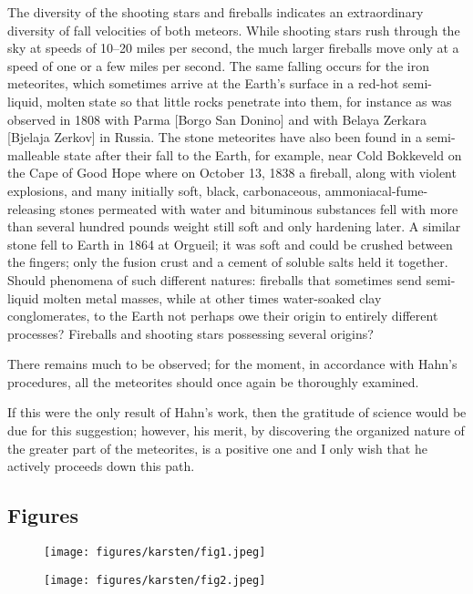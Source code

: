 \documentclass[a4paper, 12pt, oneside]{article}
\begin{document}
The diversity of the shooting stars and fireballs indicates an extraordinary diversity of fall velocities of both meteors. While shooting stars rush through the sky at speeds of 10--20 miles per second, the much larger fireballs move only at a speed of one or a few miles per second. The same falling occurs for the iron meteorites, which sometimes arrive at the Earth's surface in a red-hot semi-liquid, molten state so that little rocks penetrate into them, for instance as was observed in 1808 with Parma [Borgo San Donino] and with Belaya Zerkara [Bjelaja Zerkov] in Russia. The stone meteorites have also been found in a semi-malleable state after their fall to the Earth, for example, near Cold Bokkeveld on the Cape of Good Hope where on October 13, 1838 a fireball, along with violent explosions, and many initially soft, black, carbonaceous, ammoniacal-fume-releasing stones permeated with water and bituminous substances fell with more than several hundred pounds weight still soft and only hardening later. A similar stone fell to Earth in 1864 at Orgueil; it was soft and could be crushed between the fingers; only the fusion crust and a cement of soluble salts held it together. Should phenomena of such different natures: fireballs that sometimes send semi-liquid molten metal masses, while at other times water-soaked clay conglomerates, to the Earth not perhaps owe their origin to entirely different processes? Fireballs and shooting stars possessing several origins?

There remains much to be observed; for the moment, in accordance with Hahn's procedures, all the meteorites should once again be thoroughly examined.

If this were the only result of Hahn's work, then the gratitude of science would be due for this suggestion; however, his merit, by discovering the organized nature of the greater part of the meteorites, is a positive one and I only wish that he actively proceeds down this path.
\clearpage
\pagestyle{fancy}
\fancyhf{}
\cfoot{\thepage}
\subsection{Figures}
\begin{figure}[H]
\texttt{[image: figures/karsten/fig1.jpeg]}
\centering
\end{figure}
\clearpage
{}
\begin{figure}[t]
\centering
\texttt{[image: figures/karsten/fig2.jpeg]}
\end{figure}
\clearpage
\pagestyle{plain}
\end{document}

